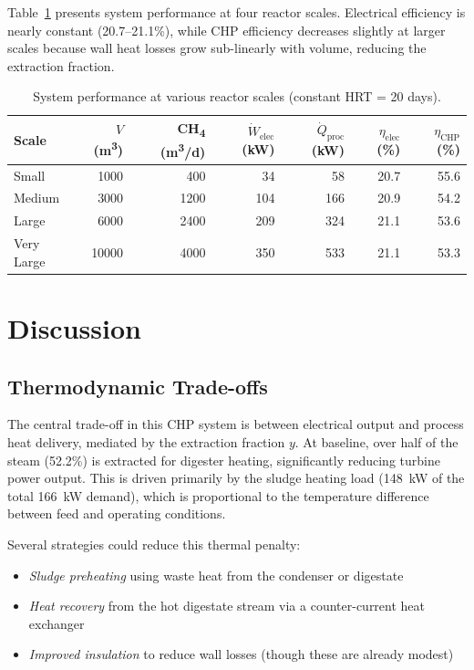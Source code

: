 \documentclass[12pt, letterpaper]{article}
\begin{document}
Table~\ref{tab:efficiency} presents system performance at four reactor scales. Electrical efficiency is nearly constant (20.7--21.1\%), while CHP efficiency decreases slightly at larger scales because wall heat losses grow sub-linearly with volume, reducing the extraction fraction.

\begin{table}[H]
  \centering
  \caption{System performance at various reactor scales (constant HRT = 20 days).}
  \label{tab:efficiency}
  \begin{tabular}{@{}lrrrrrr@{}}
    \toprule
    \textbf{Scale} & \textbf{$V$ (m\textsuperscript{3})} & \textbf{CH\textsubscript{4} (m\textsuperscript{3}/d)} & \textbf{$\dot{W}_\text{elec}$ (kW)} & \textbf{$\dot{Q}_\text{proc}$ (kW)} & \textbf{$\eta_\text{elec}$ (\%)} & \textbf{$\eta_\text{CHP}$ (\%)} \\
    \midrule
    Small      & 1000  &  400 &  34 &  58 & 20.7 & 55.6 \\
    Medium     & 3000  & 1200 & 104 & 166 & 20.9 & 54.2 \\
    Large      & 6000  & 2400 & 209 & 324 & 21.1 & 53.6 \\
    Very Large & 10000 & 4000 & 350 & 533 & 21.1 & 53.3 \\
    \bottomrule
  \end{tabular}
\end{table}

\section{Discussion}

\subsection{Thermodynamic Trade-offs}

The central trade-off in this CHP system is between electrical output and process heat delivery, mediated by the extraction fraction $y$. At baseline, over half of the steam (52.2\%) is extracted for digester heating, significantly reducing turbine power output. This is driven primarily by the sludge heating load (\SI{148}{\kilo\watt} of the total \SI{166}{\kilo\watt} demand), which is proportional to the temperature difference between feed and operating conditions.

Several strategies could reduce this thermal penalty:
\begin{itemize}[noitemsep]
  \item \textit{Sludge preheating} using waste heat from the condenser or digestate
  \item \textit{Heat recovery} from the hot digestate stream via a counter-current heat exchanger
  \item \textit{Improved insulation} to reduce wall losses (though these are already modest)
\end{itemize}
\end{document}
